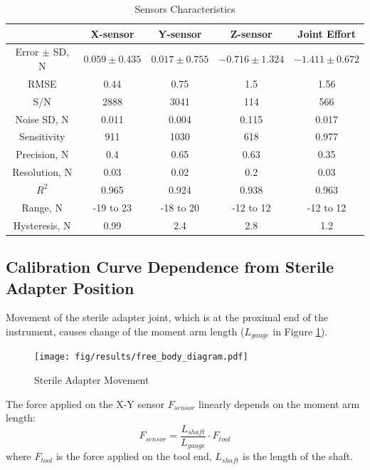 \begin{table}[h]
\caption {Sensors Characteristics} \label{tab:SenChar} 
\begin{center}
\begin{tabular}{ | c | c | c | c | c | } 
\hline
 &  X-sensor & Y-sensor & Z-sensor & Joint Effort \\ 
\hline
Error $\pm$ SD, N & $0.059 \pm 0.435$ & $0.017 \pm 0.755$ & $-0.716 \pm 1.324$ & $-1.411 \pm 0.672$ \\ 
\hline
RMSE & 0.44 & 0.75 & 1.5 & 1.56 \\ 
\hline
S/N & 2888 & 3041 & 114 & 566 \\
\hline
Noise SD, N & 0.011 & 0.004 & 0.115 & 0.017 \\
\hline
Sensitivity & 911 & 1030 & 618 & 0.977 \\
\hline
Precision, N & 0.4 & 0.65 & 0.63 & 0.35 \\
\hline
Resolution, N & 0.03 & 0.02 & 0.2 & 0.03 \\
\hline
$R^2$ & 0.965 & 0.924 & 0.938 & 0.963 \\
\hline
Range, N & -19 to 23 & -18 to 20 & -12 to 12 & -12 to 12 \\
\hline
Hysteresis, N & 0.99 & 2.4 & 2.8 & 1.2 \\
\hline
\end{tabular}
\end{center}
\end{table}

\subsection{Calibration Curve Dependence from Sterile Adapter Position}
	\label{sec:DisExp}
	
Movement of the sterile adapter joint, which is at the proximal end of the instrument, causes change of the moment arm length ($L_{gauge}$ in Figure \ref{fig:Free_Body_Diagram}).	 	

\begin{figure}[h]
	\begin{center}
	\texttt{[image: fig/results/free\_body\_diagram.pdf]}
	\end{center}
	\vspace{-4mm}
	\caption[Sterile Adapter Movement]
	{Sterile Adapter Movement}
	\label{fig:Free_Body_Diagram}
	\vspace{-2mm}
\end{figure}

	The force applied on the X-Y sensor $F_{sensor}$ linearly depends on the moment arm length:
	\begin{equation}
	F_{sensor} = \frac{L_{shaft}}{L_{gauge}} \cdot F_{tool}
	\end{equation}
	where $F_{tool}$ is the force applied on the tool end, $L_{shaft}$ is the length of the shaft.

